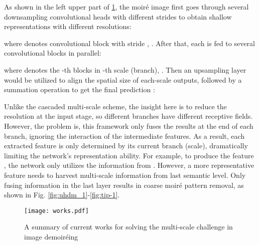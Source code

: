 \documentclass[runningheads]{llncs}
\begin{document}
As shown in the left upper part of \cref{fig:multi-scale}, the moiré image first goes through several downsampling convolutional heads with different strides to obtain shallow representations with different resolutions:

where  denotes convolutional block with stride , . After that, each  is fed to several convolutional blocks in parallel:

where  denotes the -th blocks in -th scale (branch), . Then an upsampling layer would be utilized to align the spatial size of each-scale outputs, followed by a summation operation to get the final prediction :


Unlike the cascaded multi-scale scheme, the insight here is to reduce the resolution at the input stage, so different branches have different receptive fields. However, the problem is, this framework only fuses the results at the end of each branch, ignoring the interaction of the intermediate features. As a result, each extracted feature is only determined by its current branch (scale), dramatically limiting the network's representation ability. For example, to produce the feature , the network only utilizes the information from . However, a more representative feature needs to harvest multi-scale information from last semantic level. Only fusing information in the last layer results in coarse moiré pattern removal, as shown in Fig. \ref{fig:uhdm_1}-\ref{fig:tip-1}.

\begin{figure}[H]
   \begin{center}
      \texttt{[image: works.pdf]}
   \end{center}
      
      \caption{A summary of current works for solving the multi-scale challenge in image demoiréing}
      
   \label{fig:multi-scale}
\end{figure}
\end{document}
